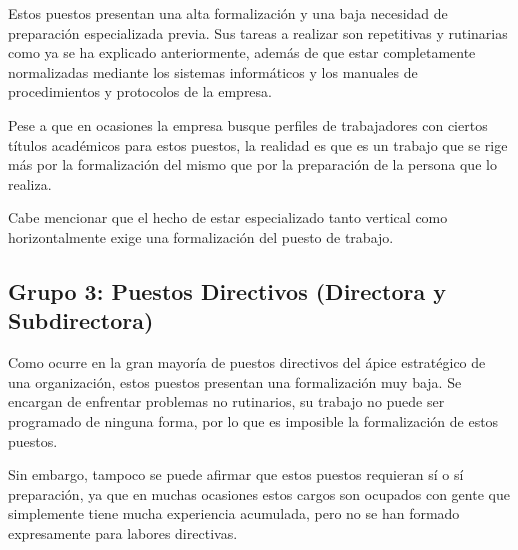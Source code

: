 Estos puestos presentan una alta formalización y una baja necesidad de preparación especializada previa. Sus tareas a realizar son repetitivas y rutinarias como ya se ha explicado anteriormente, además de que estar completamente normalizadas mediante los sistemas informáticos y los manuales de procedimientos y protocolos de la empresa.

Pese a que en ocasiones la empresa busque perfiles de trabajadores con ciertos títulos académicos para estos puestos, la realidad es que es un trabajo que se rige más por la formalización del mismo que por la preparación de la persona que lo realiza.

Cabe mencionar que el hecho de estar especializado tanto vertical como horizontalmente exige una formalización del puesto de trabajo.

\subsection{Grupo 3: Puestos Directivos (Directora y Subdirectora)}

Como ocurre en la gran mayoría de puestos directivos del ápice estratégico de una organización, estos puestos presentan una formalización muy baja. Se encargan de enfrentar problemas no rutinarios, su trabajo no puede ser programado de ninguna forma, por lo que es imposible la formalización de estos puestos.

Sin embargo, tampoco se puede afirmar que estos puestos requieran sí o sí preparación, ya que en muchas ocasiones estos cargos son ocupados con gente que simplemente tiene mucha experiencia acumulada, pero no se han formado expresamente para labores directivas.

